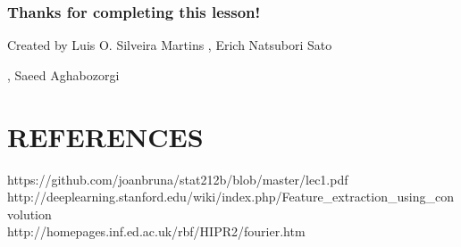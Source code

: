 \documentclass[11pt]{article}
\begin{document}
    \subsubsection{Thanks for completing this
lesson!}\label{thanks-for-completing-this-lesson}

    Created by Luis O. Silveira Martins , Erich Natsubori Sato

, Saeed Aghabozorgi 

    \section{REFERENCES}\label{references}

    https://github.com/joanbruna/stat212b/blob/master/lec1.pdf\\
http://deeplearning.stanford.edu/wiki/index.php/Feature\_extraction\_using\_convolution\\
http://homepages.inf.ed.ac.uk/rbf/HIPR2/fourier.htm


    
    
    
    
\end{document}
